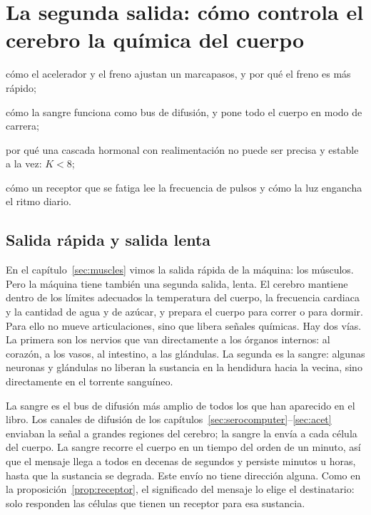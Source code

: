 \chapter{La segunda salida: cómo controla el cerebro la química del cuerpo}
\label{sec:chemoutput}
\begin{chaptergoals}
\item cómo el acelerador  y el freno  ajustan un marcapasos, y por qué el freno es más rápido;
\item cómo la sangre funciona como bus de difusión, y  pone todo el cuerpo en modo de carrera;
\item por qué una cascada hormonal con realimentación no puede ser precisa y estable a la vez: $K<8$;
\item cómo un receptor que se fatiga lee la frecuencia de pulsos y cómo la luz engancha el ritmo diario.
\end{chaptergoals}

\section{Salida rápida y salida lenta}

En el capítulo~\ref{sec:muscles} vimos la salida rápida de la máquina: los músculos. Pero la máquina tiene también una segunda salida, lenta. El cerebro mantiene dentro de los límites adecuados la temperatura del cuerpo, la frecuencia cardiaca y la cantidad de agua y de azúcar, y prepara el cuerpo para correr o para dormir. Para ello no mueve articulaciones, sino que libera señales químicas. Hay dos vías. La primera son los nervios que van directamente a los órganos internos: al corazón, a los vasos, al intestino, a las glándulas. La segunda es la sangre: algunas neuronas y glándulas no liberan la sustancia en la hendidura hacia la vecina, sino directamente en el torrente sanguíneo.

La sangre es el bus de difusión más amplio de todos los que han aparecido en el libro. Los canales de difusión de los capítulos~\ref{sec:serocomputer}--\ref{sec:acet} enviaban la señal a grandes regiones del cerebro; la sangre la envía a cada célula del cuerpo. La sangre recorre el cuerpo en un tiempo del orden de un minuto, así que el mensaje llega a todos en decenas de segundos y persiste minutos u horas, hasta que la sustancia se degrada. Este envío no tiene dirección alguna. Como en la proposición~\ref{prop:receptor}, el significado del mensaje lo elige el destinatario: solo responden las células que tienen un receptor para esa sustancia.

